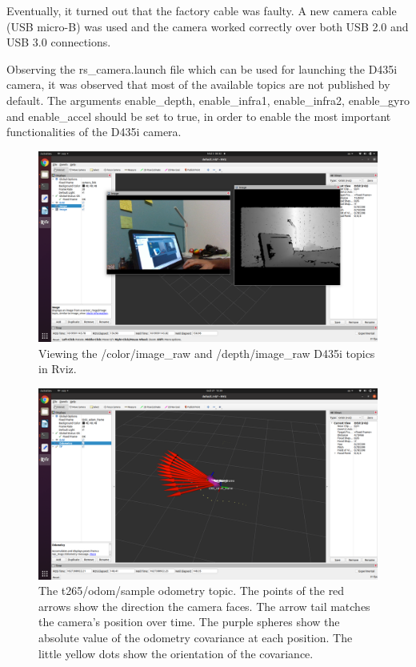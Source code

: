 \documentclass{article}
\begin{document}
Eventually, it turned out that the factory cable was faulty. A  new camera cable (USB micro-B) was used and the camera worked correctly over both USB 2.0 and USB 3.0 connections.

Observing the rs\_camera.launch file which can be used for launching the D435i camera, it was observed that most of the available topics are not published by default. The arguments enable\_depth, enable\_infra1, enable\_infra2, enable\_gyro and enable\_accel should be set to true, in order to enable the most important functionalities of the D435i camera.

\begin{figure}[h] %
    \centering
	\includegraphics[width=\textwidth,height=\textheight,keepaspectratio]{report1-img008.png} %
	\caption{Viewing the /color/image\_raw and /depth/image\_raw D435i topics in Rviz.}
\end{figure}

\begin{figure}[h] %
    \centering
	\includegraphics[width=\textwidth,height=\textheight,keepaspectratio]{report1-img009.png} %
	\caption{The t265/odom/sample odometry topic. The points of the red arrows show the direction the camera faces. The arrow tail matches the camera's position over time. The purple spheres show the absolute value of the odometry covariance at each position. The little yellow dots show the orientation of the covariance.}
\end{figure}
\end{document}

